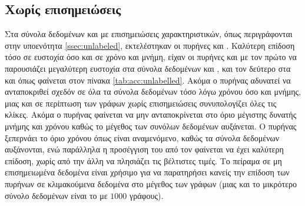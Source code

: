 \subsection{Χωρίς επισημειώσεις}
Στα σύνολα δεδομένων  και  με επισημειώσεις χαρακτηριστικών, όπως περιγράφονται στην υποενότητα \ref{ssec:unlabeled}, εκτελέστηκαν οι πυρήνες 
 και .
Καλύτερη επίδοση τόσο σε ευστοχία όσο και σε χρόνο και μνήμη, είχαν οι πυρήνες  και  με τον πρώτο να παρουσιάζει μεγαλύτερη ευστοχία στα σύνολα δεδομένων  και ,  και τον δεύτερο στα  και  όπως φαίνεται στον πίνακα \ref{tab:acc:unlabelled}.
Ακόμα ο πυρήνας  αδυνατεί να ανταποκριθεί σχεδόν σε όλα τα σύνολα δεδομένων τόσο λόγω χρόνου όσο και μνήμης, μιας και σε περίπτωση των γράφων χωρίς επισημειώσεις συνυπολογίζει όλες τις κλίκες.
Ακόμα ο πυρήνας  φαίνεται να μην ανταποκρίνεται στο όριο μέγιστης δυνατής μνήμης και χρόνου καθώς το μέγεθος των συνόλων δεδομένων αυξάνεται.
Ο πυρήνας  ξεπερνάει το όριο χρόνου όπως είναι αναμενόμενο, καθώς τα σύνολα δεδομένων αυξάνονται, ενώ παράλληλα η προσέγγιση του από τον  φαίνεται να έχει καλύτερη επίδοση, χωρίς από την άλλη να πλησιάζει τις βέλτιστες τιμές.
Το πείραμα σε μη επισημειωμένα δεδομένα είναι χρήσιμο για να παρατηρήσει κανείς την επίδοση των πυρήνων σε κλιμακούμενα δεδομένα στο μέγεθος των γράφων (μιας και το μικρότερο σύνολο δεδομένων είναι το  με $1000$ γράφους).
